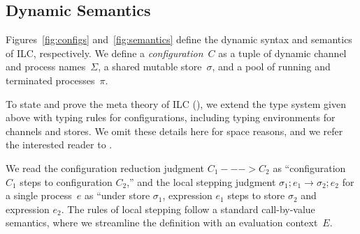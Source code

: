 \begin{comment}
The fork rule says that that if we can appropriately split the affine context
such that the child process $e_1$ has type $A$ and mode $m_1$ and the
``continue'' process $e_2$ has type $B$ and mode $m_2$, then the whole
expression has type $B$ and mode $m_3$, which is derived by composing $m_1$ and
$m_2$ in parallel. Again, we emphasize that composing two write mode processes
in parallel violates type checking, i.e., $\Wm ;; \Wm => p$ cannot be derived
for any mode $p$.

Finally, the choice rule says that if we can appropriately split the affine
context such that both subexpressions $A$ and mode $R$, then the whole
expression follows exactly.

\paragraph{Affine rules.} The affine typing rules are, for the most part, analagous to their
intuitionistic counterparts. Two differences bear mentioning. First, the bang!
rule only lifts intuitionistically typed expressions that are closed with
respect to affine variables into an affinely typed expression. Otherwise, one
could wrap an intuitionistically typed expression with free affine variables in
a bang! and use it in an unrestricted manner. Second, in contrast with the abs
rule, the lollipop rule does not require function bodies to be free with respect
to affine variables.
\end{comment}

\subsection{Dynamic Semantics}
\label{subsec:semantics}

Figures~\ref{fig:configs} and~\ref{fig:semantics} define the dynamic syntax and semantics of ILC, respectively.
%
We define a \emph{configuration}~$C$ as a tuple of dynamic channel and process names~$\Sigma$, 
a shared mutable store~$\sigma$, 
and a pool of running and terminated processes~$\pi$.

To state and prove the meta theory of ILC (), we
extend the type system given above with typing rules for
configurations, including typing environments for channels and stores. 
%
We omit these details here for space reasons, 
and we refer the interested reader to .

We read the configuration reduction judgment $C_1 ---> C_2$ as ``configuration
$C_1$ steps to configuration $C_2$,'' 
%
and the local stepping judgment $\sigma_1; e_1 \longrightarrow \sigma_2; e_2$ 
for a single process~$e$ as ``under store
$\sigma_1$, expression $e_1$ steps to store $\sigma_{2}$ and expression $e_2$.
%
The rules of local stepping follow a standard call-by-value semantics, 
where we streamline the definition with an evaluation context~$E$.


